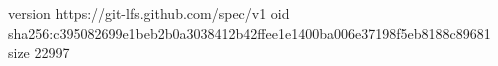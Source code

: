 version https://git-lfs.github.com/spec/v1
oid sha256:c395082699e1beb2b0a3038412b42ffee1e1400ba006e37198f5eb8188c89681
size 22997
